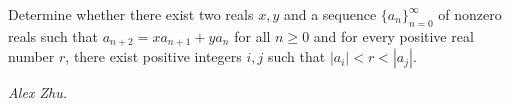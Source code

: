 Determine whether there exist two reals $x,y$ and a sequence $\{a_n\}_{n=0}^{\infty}$ of nonzero reals such that $a_{n+2}=xa_{n+1}+ya_n$ for all $n\ge0$ and for every positive real number $r$, there exist positive integers $i,j$ such that $|a_i|<r<|a_j|$.

\textit{Alex Zhu.}